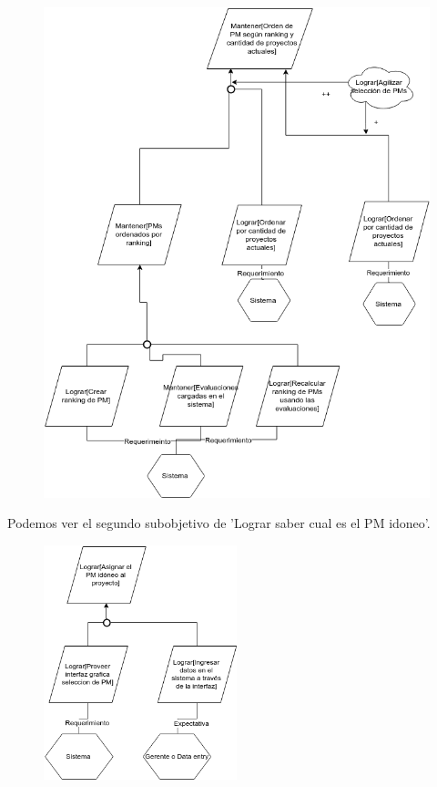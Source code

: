 \begin{figure}[H]
    \centering
    \includegraphics[width=\textwidth]{imagenes/objetivos-seleccion-mejor-pm-1-2.png}
\end{figure}

Podemos ver el segundo subobjetivo de 'Lograr saber cual es el PM idoneo'.

\begin{figure}[H]
    \centering
    \includegraphics[width=0.5\textwidth]{imagenes/objetivos-seleccion-mejor-pm-2.png}
\end{figure}

